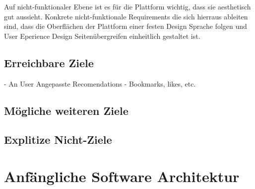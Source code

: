 Auf nicht-funktionaler Ebene ist es für die Plattform wichtig, dass sie aesthetisch gut aussieht.
Konkrete nicht-funktionale Requirements die sich hierraus ableiten sind, dass die Oberflächen der Plattform einer festen Design Sprache folgen und User Eperience Design Seitenübergreifen einheitlich gestaltet ist.

\subsection{Erreichbare Ziele}

- An User Angepasste Recomendations
- Bookmarks, likes, etc.

\subsection{Mögliche weiteren Ziele}

\subsection{Explitize Nicht-Ziele}
\section{Anfängliche Software Architektur}
